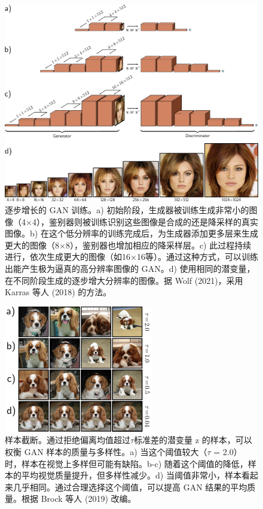 \begin{figure}[ht!]
\centering
\includegraphics[width=0.7\linewidth]{png/chapter15/GANProgressive.png}
\caption{逐步增长的 GAN 训练。a) 初始阶段，生成器被训练生成非常小的图像（4×4），鉴别器则被训练识别这些图像是合成的还是降采样的真实图像。b) 在这个低分辨率的训练完成后，为生成器添加更多层来生成更大的图像（8×8），鉴别器也增加相应的降采样层。c) 此过程持续进行，依次生成更大的图像（如16×16等）。通过这种方式，可以训练出能产生极为逼真的高分辨率图像的 GAN。d) 使用相同的潜变量，在不同阶段生成的逐步增大分辨率的图像。据 Wolf (2021)，采用 Karras 等人 (2018) 的方法。}
\end{figure}


\begin{figure}[ht!]
\centering
\includegraphics[width=0.7\linewidth]{png/chapter15/GANTruncation.png}
\caption{样本截断。通过拒绝偏离均值超过\(\tau\)标准差的潜变量 z 的样本，可以权衡 GAN 样本的质量与多样性。a) 当这个阈值较大（\(\tau\) = 2.0）时，样本在视觉上多样但可能有缺陷。b-c) 随着这个阈值的降低，样本的平均视觉质量提升，但多样性减少。d) 当阈值非常小，样本看起来几乎相同。通过合理选择这个阈值，可以提高 GAN 结果的平均质量。根据 Brock 等人 (2019) 改编。}
\end{figure}


